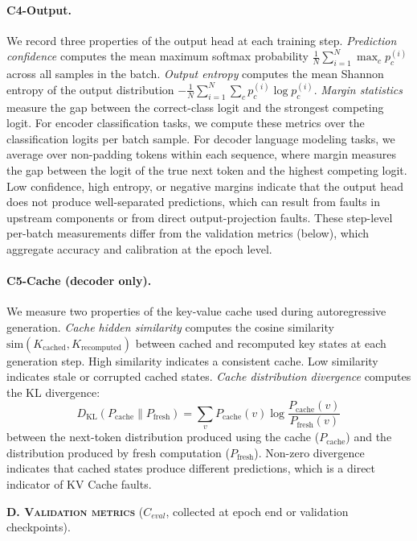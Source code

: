 \paragraph{C4-Output.} We record three properties of the output head at each training step. \emph{Prediction confidence} computes the mean maximum softmax probability $\frac{1}{N}\sum_{i=1}^{N} \max_c p_c^{(i)}$ across all samples in the batch. \emph{Output entropy} computes the mean Shannon entropy of the output distribution $-\frac{1}{N}\sum_{i=1}^{N}\sum_c p_c^{(i)} \log p_c^{(i)}$. \emph{Margin statistics} measure the gap between the correct-class logit and the strongest competing logit. For encoder classification tasks, we compute these metrics over the classification logits per batch sample. For decoder language modeling tasks, we average over non-padding tokens within each sequence, where margin measures the gap between the logit of the true next token and the highest competing logit. Low confidence, high entropy, or negative margins indicate that the output head does not produce well-separated predictions, which can result from faults in upstream components or from direct output-projection faults. These step-level per-batch measurements differ from the validation metrics (below), which aggregate accuracy and calibration at the epoch level.

\paragraph{C5-Cache (decoder only).} We measure two properties of the key-value cache used during autoregressive generation. \emph{Cache hidden similarity} computes the cosine similarity $\text{sim}(K_{\text{cached}}, K_{\text{recomputed}})$ between cached and recomputed key states at each generation step. High similarity indicates a consistent cache. Low similarity indicates stale or corrupted cached states. \emph{Cache distribution divergence} computes the KL divergence:
\begin{equation}
D_{\text{KL}}(P_{\text{cache}} \| P_{\text{fresh}}) = \sum_v P_{\text{cache}}(v) \log \frac{P_{\text{cache}}(v)}{P_{\text{fresh}}(v)}
\label{eq:cache_kl}
\end{equation}
between the next-token distribution produced using the cache ($P_{\text{cache}}$) and the distribution produced by fresh computation ($P_{\text{fresh}}$). Non-zero divergence indicates that cached states produce different predictions, which is a direct indicator of KV Cache faults.

\vspace{0.5em}
\noindent\textbf{\textsc{D. Validation metrics}} ($C_{eval}$, collected at epoch end or validation checkpoints).

